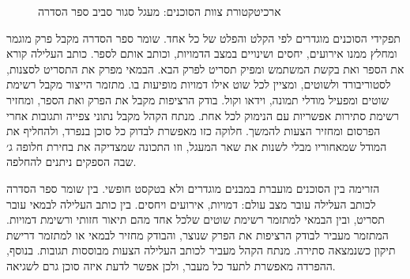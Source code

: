 \begin{figure}[h]
  \centering
  \caption{ארכיטקטורת צוות הסוכנים: מעגל סגור סביב ספר הסדרה}
  \label{fig:ch5-architecture}
\end{figure}

תפקידי הסוכנים מוגדרים לפי הקלט והפלט של כל אחד. שומר ספר הסדרה מקבל פרק מוגמר ומחלץ ממנו אירועים, יחסים ושינויים במצב הדמויות, וכותב אותם לספר. כותב העלילה קורא את הספר ואת בקשת המשתמש ומפיק תסריט לפרק הבא. הבמאי מפרק את התסריט לסצנות, לסטוריבורד ולשוטים, ומציין לכל שוט אילו דמויות מופיעות בו. מתזמר הייצור מקבל רשימת שוטים ומפעיל מודלי תמונה, וידאו וקול. בודק הרציפות מקבל את הפרק ואת הספר, ומחזיר רשימת סתירות אפשריות עם הנימוק לכל אחת. מנתח הקהל מקבל נתוני צפייה ותגובות אחרי הפרסום ומחזיר הצעות להמשך. חלוקה כזו מאפשרת לבדוק כל סוכן בנפרד, ולהחליף את המודל שמאחוריו מבלי לשנות את שאר המעגל, וזו התכונה שמצדיקה את בחירת חלופה ג׳ שבה הספקים ניתנים להחלפה.

הזרימה בין הסוכנים מועברת במבנים מוגדרים ולא בטקסט חופשי. בין שומר ספר הסדרה לכותב העלילה עובר מצב עולם: דמויות, אירועים ויחסים. בין כותב העלילה לבמאי עובר תסריט, ובין הבמאי למתזמר רשימת שוטים שלכל אחד מהם תיאור חזותי ורשימת דמויות. המתזמר מעביר לבודק הרציפות את הפרק שנוצר, והבודק מחזיר לבמאי או למתזמר דרישת תיקון כשנמצאה סתירה. מנתח הקהל מעביר לכותב העלילה הצעות מבוססות תגובות. בנוסף, ההפרדה מאפשרת לתעד כל מעבר, ולכן אפשר לדעת איזה סוכן גרם לשגיאה.

